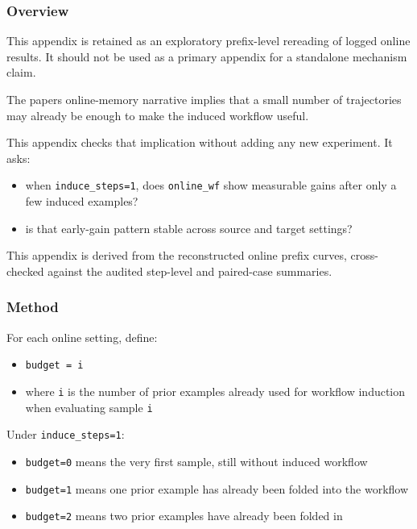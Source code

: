 \subsubsection{Overview}

This appendix is retained as an exploratory prefix-level rereading of
logged online results. It should not be used as a primary appendix for
a standalone mechanism claim.

The paper\textquotesingle s online-memory narrative implies that a small
number of trajectories may already be enough to make the induced
workflow useful.

This appendix checks that implication without adding any new experiment.
It asks:

\begin{itemize}
\tightlist
\item
  when \texttt{induce\_steps=1}, does \texttt{online\_wf} show
  measurable gains after only a few induced examples?
\item
  is that early-gain pattern stable across source and target settings?
\end{itemize}

This appendix is derived from the reconstructed online prefix curves,
cross-checked against the audited step-level and paired-case summaries.

\subsubsection{Method}

For each online setting, define:

\begin{itemize}
\tightlist
\item
  \texttt{budget\ =\ i}
\item
  where \texttt{i} is the number of prior examples already used for
  workflow induction when evaluating sample \texttt{i}
\end{itemize}

Under \texttt{induce\_steps=1}:

\begin{itemize}
\tightlist
\item
  \texttt{budget=0} means the very first sample, still without induced
  workflow
\item
  \texttt{budget=1} means one prior example has already been folded
  into the workflow
\item
  \texttt{budget=2} means two prior examples have already been folded in
\end{itemize}

